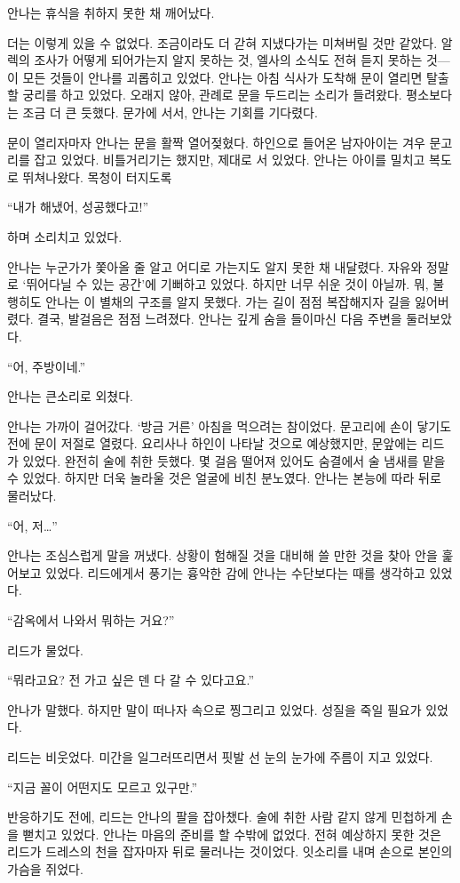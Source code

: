 안나는 휴식을 취하지 못한 채 깨어났다.

더는 이렇게 있을 수 없었다. 조금이라도 더 갇혀 지냈다가는 미쳐버릴 것만 같았다. 알렉의 조사가 어떻게 되어가는지 알지 못하는 것, 엘사의 소식도 전혀 듣지 못하는 것—이 모든 것들이 안나를 괴롭히고 있었다. 안나는 아침 식사가 도착해 문이 열리면 탈출할 궁리를 하고 있었다. 오래지 않아, 관례로 문을 두드리는 소리가 들려왔다. 평소보다는 조금 더 큰 듯했다. 문가에 서서, 안나는 기회를 기다렸다.

문이 열리자마자 안나는 문을 활짝 열어젖혔다. 하인으로 들어온 남자아이는 겨우 문고리를 잡고 있었다. 비틀거리기는 했지만, 제대로 서 있었다. 안나는 아이를 밀치고 복도로 뛰쳐나왔다. 목청이 터지도록

``내가 해냈어, 성공했다고!''

하며 소리치고 있었다.

안나는 누군가가 쫓아올 줄 알고 어디로 가는지도 알지 못한 채 내달렸다. 자유와 정말로 `뛰어다닐 수 있는 공간'에 기뻐하고 있었다. 하지만 너무 쉬운 것이 아닐까. 뭐, 불행히도 안나는 이 별채의 구조를 알지 못했다. 가는 길이 점점 복잡해지자 길을 잃어버렸다. 결국, 발걸음은 점점 느려졌다. 안나는 깊게 숨을 들이마신 다음 주변을 둘러보았다.

``어, 주방이네.''

안나는 큰소리로 외쳤다.

안나는 가까이 걸어갔다. `방금 거른' 아침을 먹으려는 참이었다. 문고리에 손이 닿기도 전에 문이 저절로 열렸다. 요리사나 하인이 나타날 것으로 예상했지만, 문앞에는 리드가 있었다. 완전히 술에 취한 듯했다. 몇 걸음 떨어져 있어도 숨결에서 술 냄새를 맡을 수 있었다. 하지만 더욱 놀라울 것은 얼굴에 비친 분노였다. 안나는 본능에 따라 뒤로 물러났다.

``어, 저\ldots''

안나는 조심스럽게 말을 꺼냈다. 상황이 험해질 것을 대비해 쓸 만한 것을 찾아 안을 훑어보고 있었다. 리드에게서 풍기는 흉악한 감에 안나는 수단보다는 때를 생각하고 있었다.

``감옥에서 나와서 뭐하는 거요?''

리드가 물었다.

``뭐라고요? 전 가고 싶은 덴 다 갈 수 있다고요.''

안나가 말했다. 하지만 말이 떠나자 속으로 찡그리고 있었다. 성질을 죽일 필요가 있었다.

리드는 비웃었다. 미간을 일그러뜨리면서 핏발 선 눈의 눈가에 주름이 지고 있었다.

``지금 꼴이 어떤지도 모르고 있구만.''

반응하기도 전에, 리드는 안나의 팔을 잡아챘다. 술에 취한 사람 같지 않게 민첩하게 손을 뻗치고 있었다. 안나는 마음의 준비를 할 수밖에 없었다. 전혀 예상하지 못한 것은 리드가 드레스의 천을 잡자마자 뒤로 물러나는 것이었다. 잇소리를 내며 손으로 본인의 가슴을 쥐었다.


